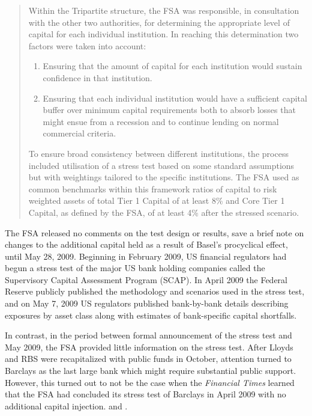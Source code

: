\documentclass[12pt]{article}
\begin{document}
\begin{quote}
 Within the Tripartite structure, the FSA was responsible, in consultation with the other two authorities, for determining the appropriate level of capital for each individual institution. In reaching this determination two factors were taken into account:
 \begin{enumerate}
  \item Ensuring that the amount of capital for each institution would sustain confidence in that institution.
  \item Ensuring that each individual institution would have a sufficient capital buffer over minimum capital requirements both to absorb losses that might ensue from a recession and to continue lending on normal commercial criteria.
 \end{enumerate}
 To ensure broad consistency between different institutions, the process included utilisation of a stress test based on some standard assumptions but with weightings tailored to the specific institutions. The FSA used as common benchmarks within this framework ratios of capital to risk weighted assets of total Tier 1 Capital of at least 8\% and Core Tier 1 Capital, as defined by the FSA, of at least 4\% after the stressed scenario.
\end{quote}

The FSA released no comments on the test design or results, save a brief note on changes to the additional capital held as a result of Basel's procyclical effect, until May 28, 2009. Beginning in February 2009, US financial regulators had begun a stress test of the major US bank holding companies called the Supervisory Capital Assessment Program (SCAP). In April 2009 the Federal Reserve publicly published the methodology and scenarios used in the stress test, and on May 7, 2009 US regulators published bank-by-bank details describing exposures by asset class along with estimates of bank-specific capital shortfalls.

In contrast, in the period between formal announcement of the stress test and May 2009, the FSA provided little information on the stress test. After Lloyds and RBS were recapitalized with public funds in October, attention turned to Barclays as the last large bank which might require substantial public support. However, this turned out to not be the case when the \textit{Financial Times} learned that the FSA had concluded its stress test of Barclays in April 2009 with no additional capital injection. \citep{Barclays1} and \citep{Lex}.
\end{document}
